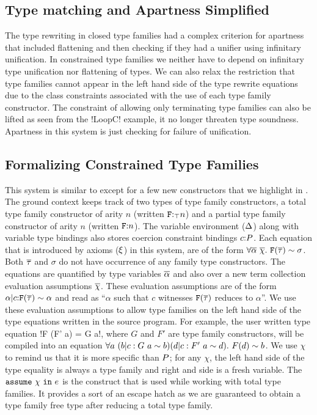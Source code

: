 \documentclass[format=acmsmall,manuscript,review,screen,nonacm,margin=1in,11pt]{acmart}
\begin{document}
\subsection{Type matching and Apartness Simplified}
The type rewriting in closed type families had a complex criterion for apartness that included
flattening and then checking if they had a unifier using infinitary unification. In constrained type families
we neither have to depend on infinitary type unification nor flattening of types. We can
also relax the restriction that type families cannot appear in the left hand side
of the type rewrite equations due to the class constraints associated with
the use of each type family constructor. The constraint of allowing only terminating
type families can also be lifted as seen from the !LoopC! example, it no longer
threaten type soundness. Apartness in this system is just checking for failure of unification.

\subsection{Formalizing Constrained Type Families}\label{subsec:tf-constrained-formal}
This system is similar to \CLTF except for a few new constructors that
we highlight in . The ground context keeps track of
two types of type family constructors, a total type family constructor of arity $n$ (written $\texttt{F}{:}_\top n$)
and a partial type family constructor of arity $n$ (written $\texttt{F}{:} n$).
The variable environment ($\Delta$) along with variable type bindings
also stores coercion constraint bindings $c{:}P$.
Each equation that is introduced by axioms ($\xi$) in this system,
are of the form $\forall\overline{\alpha}~\overline{\chi}.~\texttt{F}(\overline{\tau})\mathrel{\sim}\sigma$.
Both $\overline{\tau}$ and $\sigma$ do not have occurrence of any family type constructors. 
The equations are quantified by type variables $\overline{\alpha}$
and also over a new term collection evaluation assumptions $\overline{\chi}$.
These evaluation assumptions are of the form $\alpha|c{:}\texttt{F}(\overline{\tau})\mathrel{\sim}\alpha$ and read as
``$\alpha$ such that $c$ witnesses $\texttt{F}(\overline{\tau})$ reduces to $\alpha$''.
We use these evaluation assumptions to allow type families on the left hand side
of the type equations written in the source program. For example,
the user written type equation  !F (F' a) = G a!, where $G$ and $F'$ are type family constructors,
will be compiled into an equation $\forall a~(b|c:G~a \mathrel{\sim} b)(d|c:F'~a \mathrel{\sim} d).~ F(d) \mathrel{\sim} b$.
We use $\chi$ to remind us that it is more specific than $P$; for any $\chi$,
the left hand side of the type equality is always a type family and right and side is a fresh variable.
The $\texttt{assume}~{\chi}~\texttt{in}~{e}$ is the construct that is used while working with total type families.
It provides a sort of an escape hatch as we are guaranteed to obtain a type family free type
after reducing a total type family.
\end{document}
